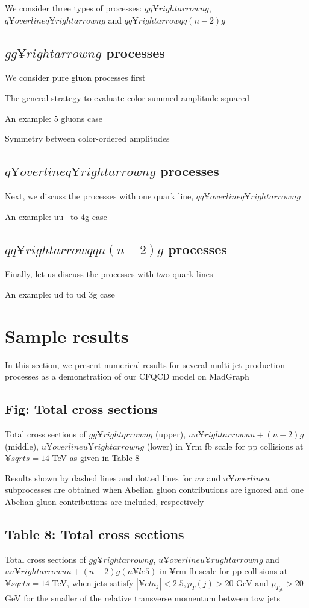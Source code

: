 \documentclass{book}
\begin{document}
We consider three types of processes: $gg¥rightarrow ng$, $q¥overline{q}¥rightarrow ng$ and $qq¥rightarrow qq (n-2) g$

\subsection{$gg¥rightarrow ng$ processes}
We consider pure gluon processes first

The general strategy to evaluate color summed amplitude squared

An example: 5 gluons case

Symmetry between color-ordered amplitudes

\subsection{$q¥overline{q}¥rightarrow ng$ processes}
Next, we discuss the processes with one quark line, $qq¥overline{q}¥rightarrow ng$

An example: uu~ to 4g case

\subsection{$qq¥rightarrow qq n(n-2) g$ processes}
Finally, let us discuss the processes with two quark lines

An example: ud to ud 3g case

\section{Sample results}
In this section, we present numerical results for several multi-jet production processes as a demonstration of our CFQCD model on MadGraph

\subsection{Fig: Total cross sections}
Total cross sections of $gg¥rightqrrow ng$ (upper), $uu¥rightarrow uu + (n-2) g$ (middle), $u¥overline{u}¥rightarrow ng$ (lower) in {¥rm fb} scale for pp collisions at $¥sqrt{s} = 14$ TeV as given in Table 8

Results shown by dashed lines and dotted lines for $uu$ and $u¥overline{u}$ subprocesses are obtained when Abelian gluon contributions are ignored and one Abelian gluon contributions are included, respectively

\subsection{Table 8: Total cross sections}
Total cross sections of $gg¥rightarrow ng$, $u¥overline{u}¥rughtarrow ng$ and $uu¥rightarrow uu +(n-2) g (n¥le 5)$ in {¥rm fb} scale for pp collisions at $¥sqrt{s} = 14$ TeV, when jets satisfy $|¥eta_j| < 2.5, p_T(j) > 20$ GeV and $p_{T_{jk}} > 20$ GeV for the smaller of the relative transverse momentum between tow jets
\end{document}
